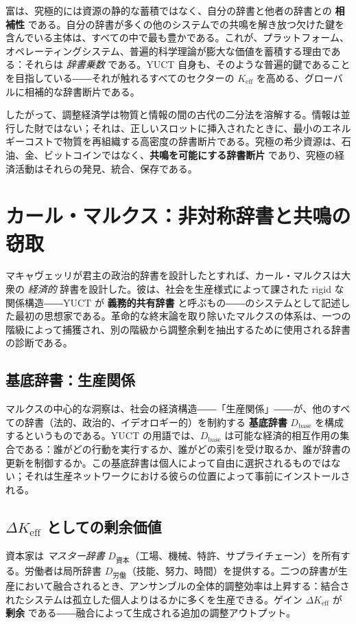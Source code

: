 \documentclass[12pt,a4paper]{article}
\newcommand{\Keff}{K_{\mathrm{eff}}}
\begin{document}
	富は、究極的には資源の静的な蓄積ではなく、自分の辞書と他者の辞書との \textbf{相補性} である。自分の辞書が多くの他のシステムでの共鳴を解き放つ欠けた鍵を含んでいる主体は、すべての中で最も豊かである。これが、プラットフォーム、オペレーティングシステム、普遍的科学理論が膨大な価値を蓄積する理由である：それらは \emph{辞書乗数} である。YUCT 自身も、そのような普遍的鍵であることを目指している――それが触れるすべてのセクターの $\Keff$ を高める、グローバルに相補的な辞書断片である。
	
	したがって、調整経済学は物質と情報の間の古代の二分法を溶解する。情報は並行した財ではない；それは、正しいスロットに挿入されたときに、最小のエネルギーコストで物質を再組織する高密度の辞書断片である。究極の希少資源は、石油、金、ビットコインではなく、\textbf{共鳴を可能にする辞書断片} であり、究極の経済活動はそれらの発見、統合、保存である。
	
	\section{カール・マルクス：非対称辞書と共鳴の窃取}
	\label{sec:marx}
	
	マキャヴェッリが君主の政治的辞書を設計したとすれば、カール・マルクスは大衆の \emph{経済的} 辞書を設計した。彼は、社会を生産様式によって課された rigid な関係構造――YUCT が \textbf{義務的共有辞書} と呼ぶもの――のシステムとして記述した最初の思想家である。革命的な終末論を取り除いたマルクスの体系は、一つの階級によって捕獲され、別の階級から調整余剰を抽出するために使用される辞書の診断である。
	
	\subsection{基底辞書：生産関係}
	
	マルクスの中心的な洞察は、社会の経済構造――「生産関係」――が、他のすべての辞書（法的、政治的、イデオロギー的）を制約する \textbf{基底辞書} \(D_{\text{base}}\) を構成するというものである。YUCT の用語では、\(D_{\text{base}}\) は可能な経済的相互作用の集合である：誰がどの行動を実行するか、誰がどの索引を受け取るか、誰が辞書の更新を制御するか。この基底辞書は個人によって自由に選択されるものではない；それは生産ネットワークにおける彼らの位置によって事前にインストールされる。
	
	\subsection{$\Delta\Keff$ としての剰余価値}
	
	資本家は \emph{マスター辞書} \(D_{\text{資本}}\)（工場、機械、特許、サプライチェーン）を所有する。労働者は局所辞書 \(D_{\text{労働}}\)（技能、努力、時間）を提供する。二つの辞書が生産において融合されるとき、アンサンブルの全体的調整効率は上昇する：結合されたシステムは孤立した個人よりはるかに多くを生産できる。ゲイン \(\Delta\Keff\) が \textbf{剰余} である――融合によって生成される追加の調整アウトプット。
	
\end{document}
